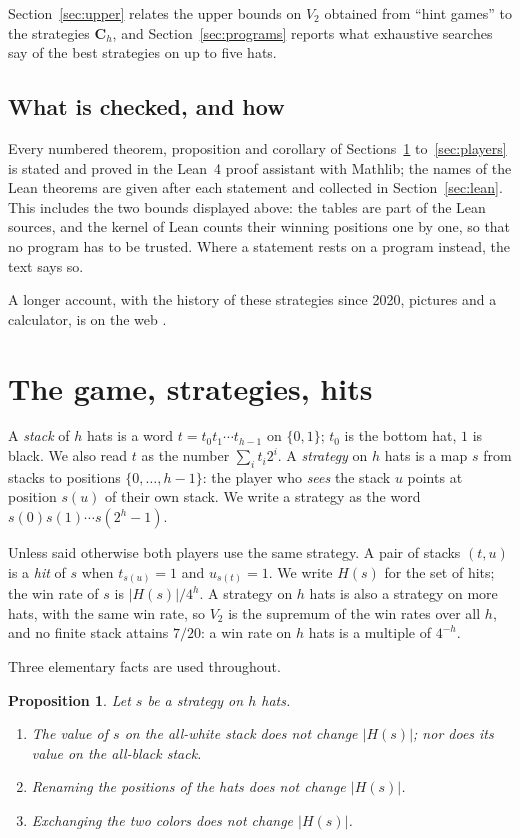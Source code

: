 \documentclass[11pt,a4paper]{article}
\newtheorem{proposition}[theorem]{Proposition}
\theoremstyle{definition}
\theoremstyle{remark}
\newcommand{\C}{\mathbf{C}}
\begin{document}
Section~\ref{sec:upper} relates the upper bounds on $V_2$ obtained from
``hint games'' to the strategies $\C_h$, and
Section~\ref{sec:programs} reports what exhaustive searches say of the
best strategies on up to five hats.

\subsection{What is checked, and how}

Every numbered theorem, proposition and corollary of
Sections~\ref{sec:game} to~\ref{sec:players} is stated and proved in the
Lean~4 proof assistant with Mathlib; the names of the Lean theorems are
given after each statement and collected in
Section~\ref{sec:lean}. This includes the two bounds displayed above:
the tables are part of the Lean sources, and the kernel of Lean counts
their winning positions one by one, so that no program has to be
trusted. Where a statement rests on a program instead, the text says so.

A longer account, with the history of these strategies since 2020,
pictures and a calculator, is on the web \cite{web}.

\section{The game, strategies, hits}\label{sec:game}

A \emph{stack} of $h$ hats is a word $t = t_0 t_1 \cdots t_{h-1}$ on
$\{0,1\}$; $t_0$ is the bottom hat, $1$ is black. We also read $t$ as the
number $\sum_i t_i 2^i$. A \emph{strategy} on $h$ hats is a map $s$ from
stacks to positions $\{0,\ldots,h-1\}$: the player who \emph{sees} the
stack $u$ points at position $s(u)$ of their own stack. We write a
strategy as the word $s(0)s(1)\cdots s(2^h-1)$.

Unless said otherwise both players use the same strategy. A pair of
stacks $(t,u)$ is a \emph{hit} of $s$ when $t_{s(u)} = 1$ and
$u_{s(t)} = 1$. We write $H(s)$ for the set of hits; the win rate of $s$
is $|H(s)|/4^h$. A strategy on $h$ hats is also a strategy on more hats,
with the same win rate, so $V_2$ is the supremum of the win rates over
all $h$, and no finite stack attains $7/20$: a win rate on $h$ hats is a
multiple of $4^{-h}$.

Three elementary facts are used throughout.

\begin{proposition}\label{prop:basic}
Let $s$ be a strategy on $h$ hats.
\begin{enumerate}
\item The value of $s$ on the all-white stack does not change $|H(s)|$;
  nor does its value on the all-black stack.
\item Renaming the positions of the hats does not change $|H(s)|$.
\item Exchanging the two colors does not change $|H(s)|$.
\end{enumerate}
\end{proposition}
\end{document}

